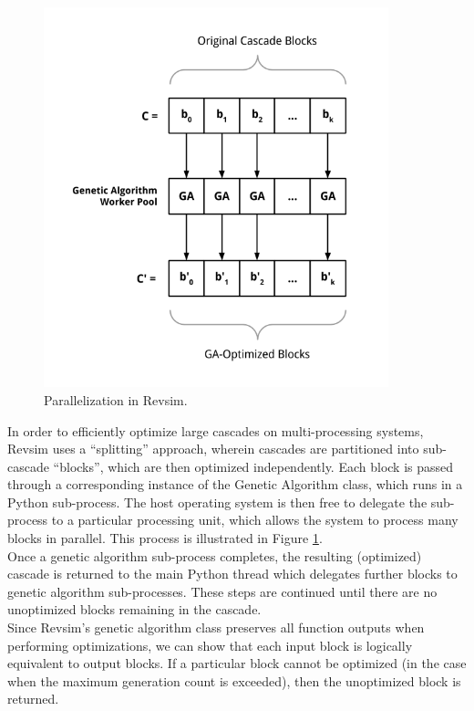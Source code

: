 \begin{figure}
  \begin{center}
    \includegraphics[width=100mm]{diagrams/parallelization.png}
  \end{center}
  \caption{Parallelization in Revsim.}
  \label{fig:parallel}
\end{figure}

In order to efficiently optimize large cascades on multi-processing systems, Revsim uses a ``splitting'' approach, wherein cascades are partitioned into sub-cascade ``blocks'', which are then optimized independently. Each block is passed through a corresponding instance of the Genetic Algorithm class, which runs in a Python sub-process. The host operating system is then free to delegate the sub-process to a particular processing unit, which allows the system to process many blocks in parallel. This process is illustrated in Figure \ref{fig:parallel}. \\

Once a genetic algorithm sub-process completes, the resulting (optimized) cascade is returned to the main Python thread which delegates further blocks to genetic algorithm sub-processes. These steps are continued until there are no unoptimized blocks remaining in the cascade. \\

Since Revsim's genetic algorithm class preserves all function outputs when performing optimizations, we can show that each input block is logically equivalent to output blocks. If a particular block cannot be optimized (in the case when the maximum generation count is exceeded), then the unoptimized block is returned.


